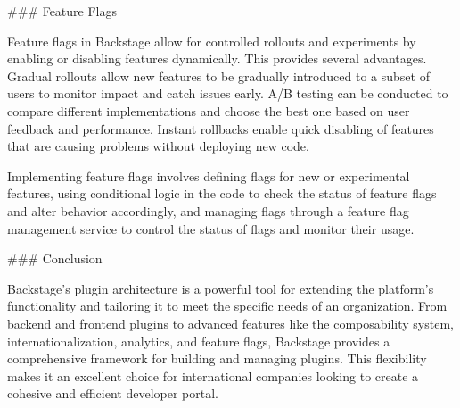 ### Feature Flags

Feature flags in Backstage allow for controlled rollouts and experiments by enabling or disabling features dynamically. This provides several advantages. Gradual rollouts allow new features to be gradually introduced to a subset of users to monitor impact and catch issues early. A/B testing can be conducted to compare different implementations and choose the best one based on user feedback and performance. Instant rollbacks enable quick disabling of features that are causing problems without deploying new code.

Implementing feature flags involves defining flags for new or experimental features, using conditional logic in the code to check the status of feature flags and alter behavior accordingly, and managing flags through a feature flag management service to control the status of flags and monitor their usage.

### Conclusion

Backstage's plugin architecture is a powerful tool for extending the platform's functionality and tailoring it to meet the specific needs of an organization. From backend and frontend plugins to advanced features like the composability system, internationalization, analytics, and feature flags, Backstage provides a comprehensive framework for building and managing plugins. This flexibility makes it an excellent choice for international companies looking to create a cohesive and efficient developer portal.